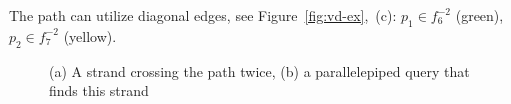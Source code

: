\documentclass[a4paper,11pt]{article}
\begin{document}
The path can utilize diagonal edges, see Figure~\ref{fig:vd-ex},~(c): \(p_1 \in f_6^{-2}\) (green), \(p_2 \in f_7^{-2}\) (yellow).

\begin{figure}[ht] \centering
	

	\caption{(a) A strand crossing the path twice, (b) a parallelepiped query that finds this strand}
	\label{fig:paral-trans}
\end{figure}


%
\end{document}
